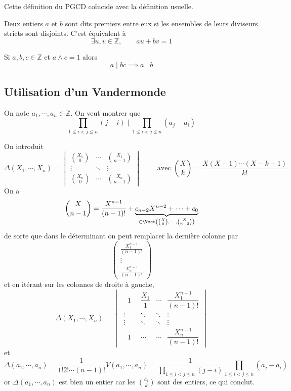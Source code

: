 \begin{rem}
    Cette définition du PGCD coïncide avec la définition usuelle.
\end{rem}

\begin{thmdef}
    Deux entiers $a$ et $b$ sont dits premiers entre eux si les ensembles de leurs diviseurs stricts sont disjoints. C'est équivalent à \[
        \exists u, v\in\mathbb Z, \qquad au+bv=1
    \]
\end{thmdef}

\begin{thm}
     Si $a, b, c\in \mathbb Z$ et $a\land c=1$ alors \[
        a\;|\;bc\implies a\;|\; b
    \]
\end{thm}

\subsection{Utilisation d'un Vandermonde}

On note $a_1, \cdots, a_n\in\mathbb Z$. On veut montrer que \[
    \prod_{1\leq i<j\leq n}(j-i)\;\Big|\; \prod_{1\leq i<j\leq n}(a_j-a_i)
\]

On introduit \[
    \Delta(X_1, \cdots, X_n)= \begin{vmatrix}
        \binom{X_1}0 & \cdots & \binom{X_1}{n-1} \\
        \vdots & \ddots & \vdots \\
        \binom{X_n}0 & \cdots & \binom{X_n}{n-1}
    \end{vmatrix}\qquad \text{ avec }\binom Xk=\frac{X(X-1)\cdots (X-k+1)}{k!}
\]
On a \[
    \binom X{n-1}=\frac{X^{n-1}}{(n-1)!}+\underbrace{c_{n-2}X^{n-2}+\cdots +c_0}_{\in \Vect \left( \binom X0, \cdots, \binom X{n-2} \right)}
\]
de sorte que dans le déterminant on peut remplacer la dernière colonne par \[
    \begin{pmatrix}
        \frac{X_1^{n-1}}{(n-1)!} \\
        \vdots \\
        \frac{X_n^{n-1}}{(n-1)!}
    \end{pmatrix}
\]
et en itérant sur les colonnes de droite à gauche, \[
    \Delta(X_1, \cdots, X_n)= \begin{vmatrix}
        \;\;\;1\;\; & \dfrac{X_1}1 & \cdots & \dfrac{X_1^{n-1}}{(n-1)!} \\
        \;\vdots & \ddots & \ddots & \vdots \\
        \;\vdots & \ddots & \ddots & \vdots \\
        \;\;\;1\;\; & \cdots & \cdots & \dfrac{X_n^{n-1}}{(n-1)!}
    \end{vmatrix}
\]
et \[
    \Delta(a_1, \cdots, a_n)=\frac1{1!2!\cdots (n-1)!}V(a_1, \cdots, a_n)=\frac1{\prod_{1\leq i<j\leq n}(j-i)}\prod_{1\leq i<j\leq n}(a_j-a_i)
\]
or $\Delta(a_1, \cdots, a_n)$ est bien un entier car les $\binom{a_i}k$ sont des entiers, ce qui conclut.

